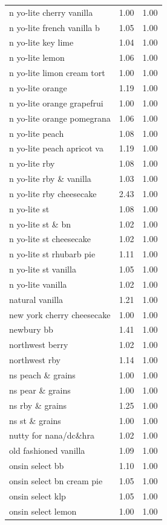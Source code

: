 \begin{table}
\begin{tabular}{lrr}
n yo-lite cherry vanilla & 1.00 & 1.00 \\
n yo-lite french vanilla b & 1.05 & 1.00 \\
n yo-lite key lime & 1.04 & 1.00 \\
n yo-lite lemon & 1.06 & 1.00 \\
n yo-lite limon cream tort & 1.00 & 1.00 \\
n yo-lite orange & 1.19 & 1.00 \\
n yo-lite orange grapefrui & 1.00 & 1.00 \\
n yo-lite orange pomegrana & 1.06 & 1.00 \\
n yo-lite peach & 1.08 & 1.00 \\
n yo-lite peach apricot va & 1.19 & 1.00 \\
n yo-lite rby & 1.08 & 1.00 \\
n yo-lite rby \& vanilla & 1.03 & 1.00 \\
n yo-lite rby cheesecake & 2.43 & 1.00 \\
n yo-lite st & 1.08 & 1.00 \\
n yo-lite st \& bn & 1.02 & 1.00 \\
n yo-lite st cheesecake & 1.02 & 1.00 \\
n yo-lite st rhubarb pie & 1.11 & 1.00 \\
n yo-lite st vanilla & 1.05 & 1.00 \\
n yo-lite vanilla & 1.02 & 1.00 \\
natural vanilla & 1.21 & 1.00 \\
new york cherry cheesecake & 1.00 & 1.00 \\
newbury bb & 1.41 & 1.00 \\
northwest berry & 1.02 & 1.00 \\
northwest rby & 1.14 & 1.00 \\
ns peach \& grains & 1.00 & 1.00 \\
ns pear \& grains & 1.00 & 1.00 \\
ns rby \& grains & 1.25 & 1.00 \\
ns st \& grains & 1.00 & 1.00 \\
nutty for nana/dc\&hra & 1.02 & 1.00 \\
old fashioned vanilla & 1.09 & 1.00 \\
onsin select bb & 1.10 & 1.00 \\
onsin select bn cream pie & 1.05 & 1.00 \\
onsin select klp & 1.05 & 1.00 \\
onsin select lemon & 1.00 & 1.00 \\

\end{tabular}
\end{table}
